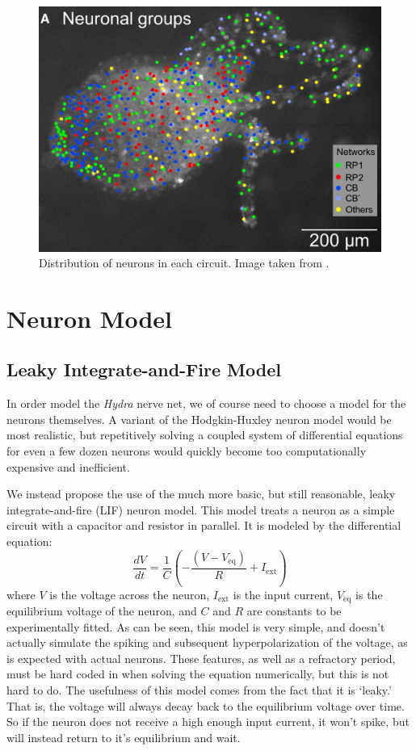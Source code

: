 \documentclass{article}
\begin{document}
\begin{figure}[!htb]
    \centering
    \includegraphics[scale=0.5]{old/hydra_map.png}
    \caption{Distribution of neurons in each circuit. Image taken from \cite{hydra}.}
    \label{fig:map}
\end{figure}

\newpage

\section{Neuron Model}
\subsection{Leaky Integrate-and-Fire Model}
In order model the \textit{Hydra} nerve net, we of course need to choose a model for the neurons themselves. A variant of the Hodgkin-Huxley neuron model would be most realistic, but repetitively solving a coupled system of differential equations for even a few dozen neurons would quickly become too computationally expensive and inefficient.

We instead propose the use of the much more basic, but still reasonable, leaky integrate-and-fire (LIF) neuron model. This model treats a neuron as a simple circuit with a capacitor and resistor in parallel. It is modeled by the differential equation:
\begin{equation}
\frac{dV}{dt}=\frac{1}{C}\left(-\frac{(V-V_{\mathrm{eq}})}{R}+I_{\mathrm{ext}}\right)
\end{equation}
where $V$ is the voltage across the neuron, $I_{\mathrm{ext}}$ is the input current, $V_{\mathrm{eq}}$ is the equilibrium voltage of the neuron, and $C$ and $R$ are constants to be experimentally fitted. 
As can be seen, this model is very simple, and doesn't actually simulate the spiking and subsequent hyperpolarization of the voltage, as is expected with actual neurons. These features, as well as a refractory period, must be hard coded in when solving the equation numerically, but this is not hard to do. The usefulness of this model comes from the fact that it is `leaky.' That is, the voltage will always decay back to the equilibrium voltage over time. So if the neuron does not receive a high enough input current, it won't spike, but will instead return to it's equilibrium and wait.
\end{document}
